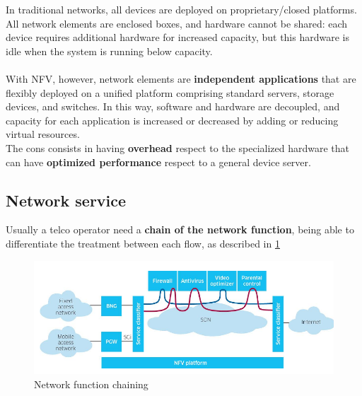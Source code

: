 \documentclass[10pt,a4paper]{report}
\theoremstyle{definition}
\begin{document}
In traditional networks, all devices are deployed on proprietary/closed platforms. All network elements are enclosed boxes, and hardware cannot be shared: each device requires additional hardware for increased capacity, but this hardware is idle when the system is running below capacity.\\\\
With NFV, however, network elements are \textbf{independent applications} that are flexibly deployed on a unified platform comprising standard servers, storage devices, and switches. In this way, software and hardware are decoupled, and capacity for each application is increased or decreased by adding or reducing virtual resources.\\
The cons consists in having \textbf{overhead} respect to the specialized hardware that can have \textbf{optimized performance} respect to a general device server.
\subsection{Network service}\label{sec:network-service}
Usually a telco operator need a \textbf{chain of the network function}, being able to differentiate the treatment between each flow, as described in \ref{flow-services}

\begin{figure}[h]
	\centering\includegraphics[scale=0.50]{images/Pasted image 20230405165919.png}
	\caption{Network function chaining}
\label{flow-services}
\end{figure}
\end{document}
